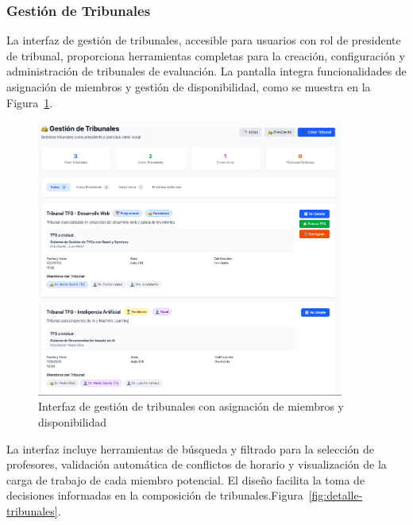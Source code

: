 \documentclass[12pt,a4paper,oneside]{report}
\begin{document}
\subsubsection{Gestión de Tribunales}\label{gestion-de-tribunales}

La interfaz de gestión de tribunales, accesible para usuarios con rol de presidente de tribunal, proporciona herramientas completas para la creación, configuración y administración de tribunales de evaluación. La pantalla integra funcionalidades de asignación de miembros y gestión de disponibilidad, como se muestra en la Figura~\ref{fig:gestion-tribunales}.

\begin{figure}[H]
\centering
\includegraphics[width=0.9\textwidth]{processed/images/gestion_tribunales.png}
\caption{Interfaz de gestión de tribunales con asignación de miembros y disponibilidad}
\label{fig:gestion-tribunales}
\end{figure}

La interfaz incluye herramientas de búsqueda y filtrado para la selección de profesores, validación automática de conflictos de horario y visualización de la carga de trabajo de cada miembro potencial. El diseño facilita la toma de decisiones informadas en la composición de tribunales.Figura~\ref{fig:detalle-tribunales}.
\end{document}
